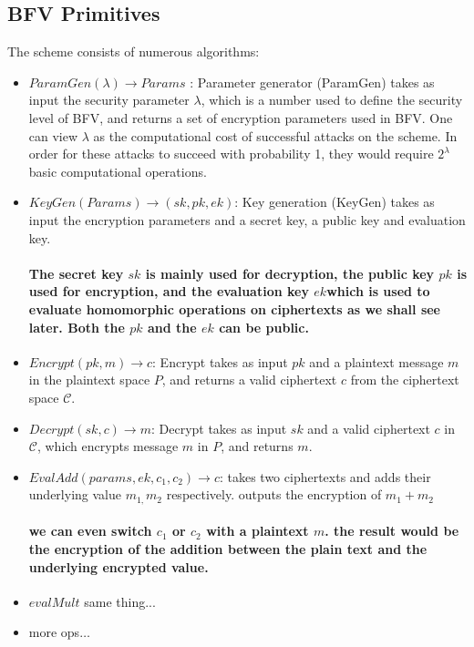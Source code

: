 \subsection{BFV Primitives}

The scheme consists of numerous algorithms:
\begin{itemize}
\item $ParamGen(\lambda)\to Params$ : Parameter generator (ParamGen) takes
as input the security parameter $\lambda$, which is a number used
to define the security level of BFV, and returns a set of encryption
parameters used in BFV. One can view $\lambda$ as the computational
cost of successful attacks on the scheme. In order for these attacks
to succeed with probability 1, they would require $2^{\lambda}$ basic
computational operations.
\item $KeyGen\left(Params\right)\to\left(sk,pk,ek\right)$: Key generation
(KeyGen) takes as input the encryption parameters and a secret key,
a public key and evaluation key. 

\paragraph{The secret key $sk$ is mainly used for decryption, the public key
$pk$ is used for encryption, and the evaluation key $ek$which is
used to evaluate homomorphic operations on ciphertexts as we shall
see later. Both the $pk$ and the $ek$ can be public.}
\item $Encrypt\left(pk,m\right)\to c$: Encrypt takes as input $pk$ and
a plaintext message $m$ in the plaintext space $P$, and returns
a valid ciphertext $c$ from the ciphertext space $\mathcal{C}$.
\item $Decrypt\left(sk,c\right)\to m$: Decrypt takes as input $sk$ and
a valid ciphertext $c$ in $\mathcal{C}$, which encrypts message
$m$ in $P$, and returns $m$.
\item $EvalAdd\left(params,ek,c_{1},c_{2}\right)\to c$: takes two ciphertexts
and adds their underlying value $m_{1,}m_{2}$ respectively. outputs
the encryption of $m_{1}+m_{2}$

\paragraph{we can even switch $c_{1}$ or $c_{2}$ with a plaintext $m$. the
result would be the encryption of the addition between the plain text
and the underlying encrypted value.}
\item $evalMult$ same thing...
\item more ops$\dots$
\end{itemize}

